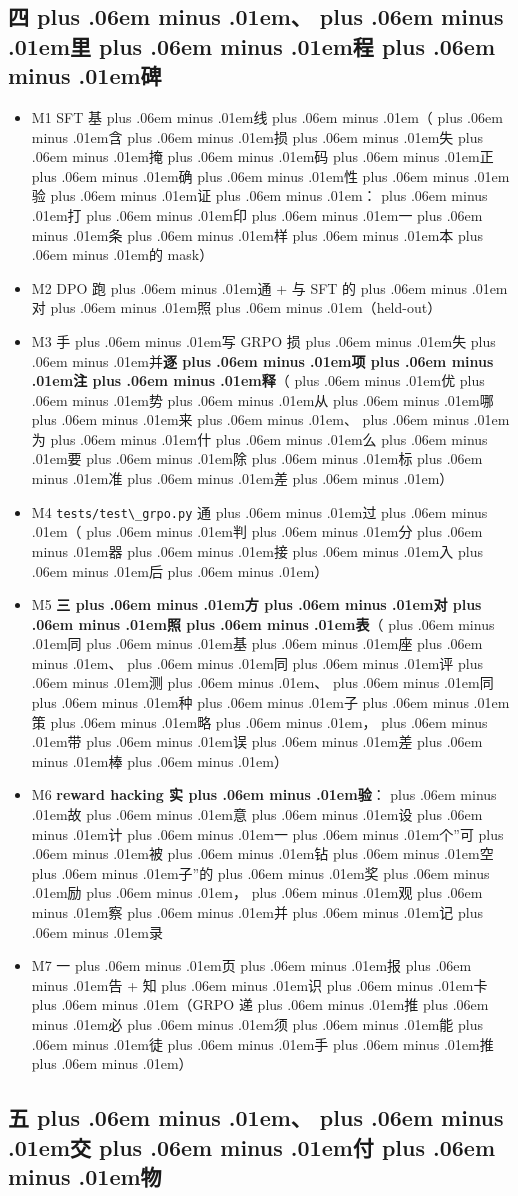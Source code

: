 \documentclass[
]{article}
\newcommand{\passthrough}[1]{#1}
\providecommand{\tightlist}{%
  \setlength{\itemsep}{0pt}\setlength{\parskip}{0pt}}
\def\zh#1{{\zhfont #1}}
\def\zhglue{\hskip0pt plus .06em minus .01em}
\begin{document}
\subsection{\zh{四\zhglue 、\zhglue 里\zhglue 程\zhglue 碑}}\label{ux56dbux91ccux7a0bux7891}

\begin{itemize}
\tightlist
\item[$\square$]
  M1 SFT \zh{基\zhglue 线\zhglue （\zhglue 含\zhglue 损\zhglue 失\zhglue 掩\zhglue 码\zhglue 正\zhglue 确\zhglue 性\zhglue 验\zhglue 证\zhglue ：\zhglue 打\zhglue 印\zhglue 一\zhglue 条\zhglue 样\zhglue 本\zhglue 的} mask\zh{）}
\item[$\square$]
  M2 DPO \zh{跑\zhglue 通} + \zh{与} SFT \zh{的\zhglue 对\zhglue 照\zhglue （}held-out\zh{）}
\item[$\square$]
  M3 \zh{手\zhglue 写} GRPO \zh{损\zhglue 失\zhglue 并}\textbf{\zh{逐\zhglue 项\zhglue 注\zhglue 释}}\zh{（\zhglue 优\zhglue 势\zhglue 从\zhglue 哪\zhglue 来\zhglue 、\zhglue 为\zhglue 什\zhglue 么\zhglue 要\zhglue 除\zhglue 标\zhglue 准\zhglue 差\zhglue ）}
\item[$\square$]
  M4 \passthrough{\lstinline!tests/test\_grpo.py!} \zh{通\zhglue 过\zhglue （\zhglue 判\zhglue 分\zhglue 器\zhglue 接\zhglue 入\zhglue 后\zhglue ）}
\item[$\square$]
  M5 \textbf{\zh{三\zhglue 方\zhglue 对\zhglue 照\zhglue 表}}\zh{（\zhglue 同\zhglue 基\zhglue 座\zhglue 、\zhglue 同\zhglue 评\zhglue 测\zhglue 、\zhglue 同\zhglue 种\zhglue 子\zhglue 策\zhglue 略\zhglue ，\zhglue 带\zhglue 误\zhglue 差\zhglue 棒\zhglue ）}
\item[$\square$]
  M6 \textbf{reward hacking \zh{实\zhglue 验}}\zh{：\zhglue 故\zhglue 意\zhglue 设\zhglue 计\zhglue 一\zhglue 个}''\zh{可\zhglue 被\zhglue 钻\zhglue 空\zhglue 子}''\zh{的\zhglue 奖\zhglue 励\zhglue ，\zhglue 观\zhglue 察\zhglue 并\zhglue 记\zhglue 录}
\item[$\square$]
  M7 \zh{一\zhglue 页\zhglue 报\zhglue 告} + \zh{知\zhglue 识\zhglue 卡\zhglue （}GRPO \zh{递\zhglue 推\zhglue 必\zhglue 须\zhglue 能\zhglue 徒\zhglue 手\zhglue 推\zhglue ）}
\end{itemize}

\subsection{\zh{五\zhglue 、\zhglue 交\zhglue 付\zhglue 物}}\label{ux4e94ux4ea4ux4ed8ux7269}
\end{document}
